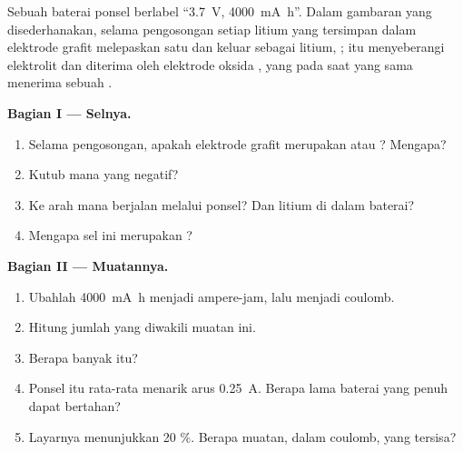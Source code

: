\begin{problem}
\label{pb:g12:cells-and-electrolysis:1}
Sebuah baterai ponsel berlabel ``\qty{3.7}{V}, \qty{4000}{mA.h}''.
Dalam gambaran yang disederhanakan, selama pengosongan setiap 
litium yang tersimpan dalam elektrode grafit melepaskan satu 
dan keluar sebagai  litium, ;  itu menyeberangi
elektrolit dan diterima oleh elektrode oksida , yang pada saat yang
sama menerima sebuah .

\medskip
\noindent\textbf{Bagian I --- Selnya.}
\begin{enumerate}
  \item Selama pengosongan, apakah elektrode grafit merupakan  atau
        ? Mengapa?
  \item Kutub mana yang negatif?
  \item Ke arah mana  berjalan melalui ponsel? Dan 
        litium di dalam baterai?
  \item Mengapa sel ini merupakan ?
\end{enumerate}

\medskip
\noindent\textbf{Bagian II --- Muatannya.}
\begin{enumerate}[resume]
  \item Ubahlah \qty{4000}{mA.h} menjadi ampere-jam, lalu menjadi
        coulomb.
  \item Hitung jumlah  yang diwakili muatan ini.
  \item Berapa banyak  itu?
  \item Ponsel itu rata-rata menarik arus \qty{0.25}{A}. Berapa lama
        baterai yang penuh dapat bertahan?
  \item Layarnya menunjukkan 20 \%. Berapa muatan, dalam coulomb, yang
        tersisa?
\end{enumerate}


\end{problem}
